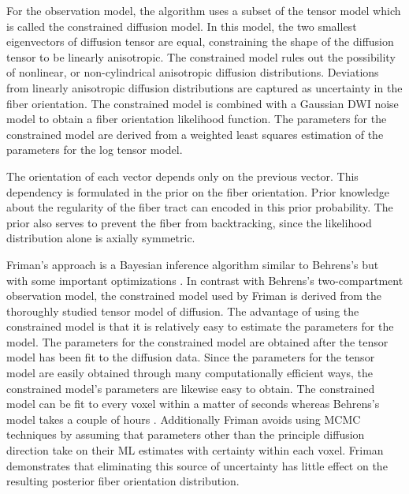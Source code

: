 \documentclass{article}
\begin{document}
For the observation model, the algorithm uses a subset of the tensor model which is called the constrained diffusion model.  In this model, the two smallest eigenvectors of diffusion tensor are equal, constraining the shape of the diffusion tensor to be linearly anisotropic.  The constrained model rules out the possibility of nonlinear, or non-cylindrical anisotropic diffusion distributions.  Deviations from linearly anisotropic diffusion distributions are captured as uncertainty in the fiber orientation.  The constrained model is combined with a Gaussian DWI noise model to obtain a fiber orientation likelihood function.  The parameters for the constrained model are derived from a weighted least squares estimation of the parameters for the log tensor model.

The orientation of each vector depends only on the previous vector.  This dependency is formulated in the prior on the fiber orientation.  Prior knowledge about the regularity of the fiber tract can encoded in this prior probability.  The prior also serves to prevent the fiber from backtracking, since the likelihood distribution alone is axially symmetric.

Friman's approach is a Bayesian inference algorithm similar to Behrens's but with some important optimizations \cite{frimanTMI06}.  In contrast with Behrens's two-compartment observation model, the constrained model used by Friman is derived from the thoroughly studied tensor model of diffusion.  The advantage of using the constrained model is that it is relatively easy to estimate the parameters for the model.  The parameters for the constrained model are obtained after the tensor model has been fit to the diffusion data.  Since the parameters for the tensor model are easily obtained through many computationally efficient ways, the constrained model's parameters are likewise easy to obtain.  The constrained model can be fit to every voxel within a matter of seconds whereas Behrens's model takes a couple of hours \cite{frimanTMI06}.  Additionally Friman avoids using MCMC techniques by assuming that parameters other than the principle diffusion direction take on their ML estimates with certainty within each voxel.  Friman demonstrates that eliminating this source of uncertainty has little effect on the resulting posterior fiber orientation distribution.
\end{document}
